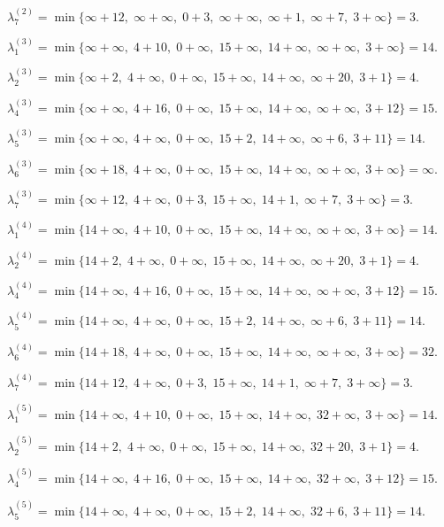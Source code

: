 \documentclass[fleqn]{article}
\begin{document}
$\lambda_7^{(2)} =\min\{\infty+12,\; \infty+\infty,\; 0+3,\; \infty+\infty,\; \infty+1,\; \infty+7,\; 3+\infty\}=3.$

\medskip

$\lambda_1^{(3)} =\min\{\infty+\infty,\; 4+10,\; 0+\infty,\; 15+\infty,\; 14+\infty,\; \infty+\infty,\; 3+\infty\}=14.$

$\lambda_2^{(3)} =\min\{\infty+2,\; 4+\infty,\; 0+\infty,\; 15+\infty,\; 14+\infty,\; \infty+20,\; 3+1\}=4.$

$\lambda_4^{(3)} =\min\{\infty+\infty,\; 4+16,\; 0+\infty,\; 15+\infty,\; 14+\infty,\; \infty+\infty,\; 3+12\}=15.$

$\lambda_5^{(3)} =\min\{\infty+\infty,\; 4+\infty,\; 0+\infty,\; 15+2,\; 14+\infty,\; \infty+6,\; 3+11\}=14.$

$\lambda_6^{(3)} =\min\{\infty+18,\; 4+\infty,\; 0+\infty,\; 15+\infty,\; 14+\infty,\; \infty+\infty,\; 3+\infty\}=\infty.$

$\lambda_7^{(3)} =\min\{\infty+12,\; 4+\infty,\; 0+3,\; 15+\infty,\; 14+1,\; \infty+7,\; 3+\infty\}=3.$

\medskip

$\lambda_1^{(4)} =\min\{14+\infty,\; 4+10,\; 0+\infty,\; 15+\infty,\; 14+\infty,\; \infty+\infty,\; 3+\infty\}=14.$

$\lambda_2^{(4)} =\min\{14+2,\; 4+\infty,\; 0+\infty,\; 15+\infty,\; 14+\infty,\; \infty+20,\; 3+1\}=4.$

$\lambda_4^{(4)} =\min\{14+\infty,\; 4+16,\; 0+\infty,\; 15+\infty,\; 14+\infty,\; \infty+\infty,\; 3+12\}=15.$

$\lambda_5^{(4)} =\min\{14+\infty,\; 4+\infty,\; 0+\infty,\; 15+2,\; 14+\infty,\; \infty+6,\; 3+11\}=14.$

$\lambda_6^{(4)} =\min\{14+18,\; 4+\infty,\; 0+\infty,\; 15+\infty,\; 14+\infty,\; \infty+\infty,\; 3+\infty\}=32.$

$\lambda_7^{(4)} =\min\{14+12,\; 4+\infty,\; 0+3,\; 15+\infty,\; 14+1,\; \infty+7,\; 3+\infty\}=3.$

\medskip

$\lambda_1^{(5)} =\min\{14+\infty,\; 4+10,\; 0+\infty,\; 15+\infty,\; 14+\infty,\; 32+\infty,\; 3+\infty\}=14.$

$\lambda_2^{(5)} =\min\{14+2,\; 4+\infty,\; 0+\infty,\; 15+\infty,\; 14+\infty,\; 32+20,\; 3+1\}=4.$

$\lambda_4^{(5)} =\min\{14+\infty,\; 4+16,\; 0+\infty,\; 15+\infty,\; 14+\infty,\; 32+\infty,\; 3+12\}=15.$

$\lambda_5^{(5)} =\min\{14+\infty,\; 4+\infty,\; 0+\infty,\; 15+2,\; 14+\infty,\; 32+6,\; 3+11\}=14.$
\end{document}
